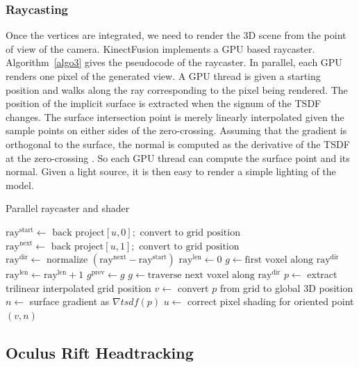 \documentclass[12pt]{article}
\begin{document}
\subsubsection{Raycasting}
Once the vertices are integrated, we need to render the 3D scene from the point of view of the camera. KinectFusion implements a GPU based raycaster. Algorithm~\ref{algo3} gives the pseudocode of the raycaster. In parallel, each GPU renders one pixel of the generated view. A GPU thread is given a starting position and walks along the ray corresponding to the pixel being rendered. The position of the implicit surface is extracted when the signum of the TSDF changes. The surface intersection point is merely linearly interpolated given the sample points on either sides of the zero-crossing. Assuming that the gradient is orthogonal to the surface, the normal is computed as the derivative of the TSDF at the zero-crossing \cite{SDF}. So each GPU thread can compute the surface point and its normal. Given a light source, it is then easy to render a simple lighting of the model.

\begin{algorithm}
\caption{Parallel raycaster and shader}\label{algo3}
\begin{algorithmic}[1]
  \State $\text{ray}^{\text{start}} \gets \text{ back project} [u,0]; \text{ convert to grid position}$
  \State $\text{ray}^{\text{next}} \gets \text{ back project} [u,1]; \text{ convert to grid position}$
  \State $\text{ray}^{\text{dir}} \gets \text{ normalize }(\text{ray}^{\text{next}}-\text{ray}^{\text{start}})$
  \State $\text{ray}^{\text{len}} \gets 0$
  \State $g \gets \text{first voxel along } \text{ray}^{\text{dir}}$
    \State $\text{ray}^{\text{len}} \gets \text{ray}^{\text{len}} + 1$
    \State $g^{\text{prev}} \gets g$
    \State $g \gets \text{traverse next voxel along }\text{ray}^{\text{dir}}$
      \State $p \gets$ extract trilinear interpolated grid position
      \State $v \gets$ convert $p$ from grid to global 3D position
      \State $n \gets$ surface gradient as $\nabla tsdf(p)$
      \State $u \gets$ correct pixel shading for oriented point $(v,n)$
      \EndIf
    \EndWhile
\EndFor
\end{algorithmic}
\end{algorithm}

\subsection{Oculus Rift Headtracking}
\end{document}
